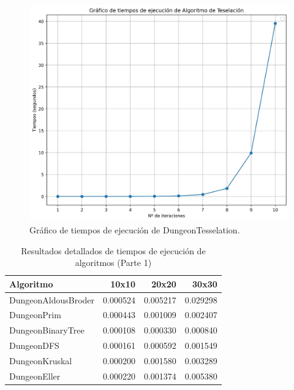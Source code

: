 \begin{figure}
    \centering  
    \includegraphics[width=\textwidth]{img/TeselacionTiempos.jpeg}  
    \caption{Gráfico de tiempos de ejecución de DungeonTesselation.}  
    \label{fig:TeselacionTiempos}
\end{figure}

\begin{table}
\centering
\caption{Resultados detallados de tiempos de ejecución de algoritmos (Parte 1)}
\label{tab:resultados_detallados_parte1}
\begin{tabular}{lrrr}
\toprule
          Algoritmo &    10x10 &    20x20 &    30x30 \\
\midrule
DungeonAldousBroder & 0.000524 & 0.005217 & 0.029298 \\
        DungeonPrim & 0.000443 & 0.001009 & 0.002407 \\
  DungeonBinaryTree & 0.000108 & 0.000330 & 0.000840 \\
         DungeonDFS & 0.000161 & 0.000592 & 0.001549 \\
     DungeonKruskal & 0.000200 & 0.001580 & 0.003289 \\
       DungeonEller & 0.000220 & 0.001374 & 0.005380 \\
\bottomrule
\end{tabular}
\end{table}

